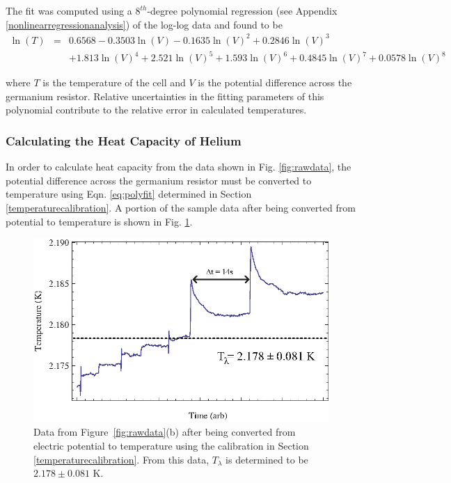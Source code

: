 The fit was computed using a $8^{th}$-degree polynomial regression (see Appendix \ref{nonlinearregressionanalysis}) of the log-log data and found to be 
\begin{eqnarray}\label{eq:polyfit}
\ln(T) &=& 0.6568 - 0.3503\ln(V) - 0.1635\ln(V)^{2} + 0.2846\ln(V)^{3} \\
& & + 1.813\ln(V)^{4} + 2.521\ln(V)^{5} + 1.593\ln(V)^{6} + 0.4845\ln(V)^{7} + 0.0578\ln(V)^{8} \nonumber
\end{eqnarray}

where $T$ is the temperature of the cell and $V$ is the potential difference across the germanium resistor.  Relative uncertainties in the fitting parameters of this polynomial contribute to the relative error in calculated temperatures.   

\subsubsection{Calculating the Heat Capacity of Helium}\label{calculatingtheheatcapacityofthecell}

In order to calculate heat capacity from the data shown in Fig. \ref{fig:rawdata}, the potential difference across the germanium resistor must be converted to temperature using Eqn. \ref{eq:polyfit} determined in Section \ref{temperaturecalibration}. A portion of the sample data after being converted from potential to temperature is shown in Fig. \ref{fig:heatingdata}.  
\begin{figure}[htbp]
\begin{center}
\includegraphics[height=70mm]{./figures/heatingdata.eps}
\caption{\small{Data from Figure~\ref{fig:rawdata}(b) after being converted from electric potential to temperature using the calibration in Section \ref{temperaturecalibration}.  From this data, $T_{\lambda}$ is determined to be $2.178\pm0.081$ K.}}
\label{fig:heatingdata}
\end{center}
\end{figure}

